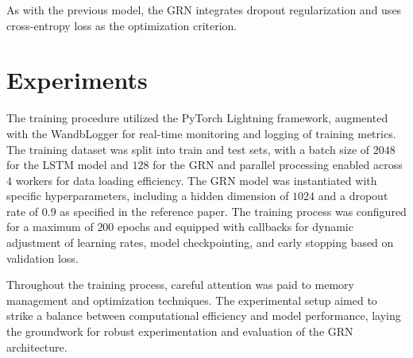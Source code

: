 \documentclass[twocolumn,twoside]{article}
\begin{document}
As with the previous model, the GRN integrates dropout regularization and uses
cross-entropy loss as the optimization criterion.

\section{Experiments}
The training procedure utilized the PyTorch Lightning framework,
augmented with the WandbLogger for real-time monitoring and logging of
training metrics. The training dataset was split into train and test sets,
with a batch size of $2048$ for the LSTM model and $128$ for the GRN
 and parallel processing enabled across $4$ workers for
data loading efficiency. The GRN model was instantiated with specific
hyperparameters, including a hidden dimension of $1024$ and a dropout rate of $0.9$
as specified in the reference paper. The training process was configured
for a maximum of $200$ epochs and equipped with callbacks for dynamic
adjustment of learning rates, model checkpointing, and early
stopping based on validation loss.

Throughout the training process, careful attention was paid to memory
management and optimization techniques. The experimental setup aimed to
strike a balance between computational efficiency and model performance,
laying the groundwork for robust experimentation and evaluation of the
GRN architecture.
\end{document}

